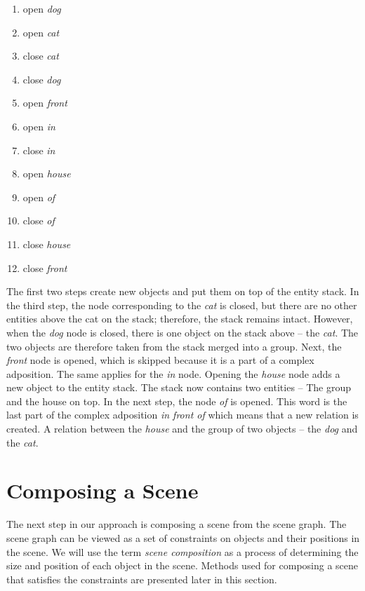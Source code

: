 \begin{enumerate}
    \item open \emph{dog}
    \item open \emph{cat}
    \item close \emph{cat}
    \item close \emph{dog}
    \item open \emph{front}
    \item open \emph{in}
    \item close \emph{in}
    \item open \emph{house}
    \item open \emph{of}
    \item close \emph{of}
    \item close \emph{house}
    \item close \emph{front}
\end{enumerate}

The first two steps create new objects and put them on top of the entity stack. In the third step, the node corresponding to the \emph{cat} is closed, but there are no other entities above the cat on the stack; therefore, the stack remains intact. However, when the \emph{dog} node is closed, there is one object on the stack above -- the \emph{cat}. The two objects are therefore taken from the stack merged into a group. Next, the \emph{front} node is opened, which is skipped because it is a part of a complex adposition. The same applies for the \emph{in} node. Opening the \emph{house} node adds a new object to the entity stack. The stack now contains two entities -- The group and the house on top. In the next step, the node \emph{of} is opened. This word is the last part of the complex adposition \emph{in front of} which means that a new relation is created. A relation between the \emph{house} and the group of two objects -- the \emph{dog} and the \emph{cat}.

\section{Composing a Scene}
\label{sec:composing_scene}

The next step in our approach is composing a scene from the scene graph. The scene graph can be viewed as a set of constraints on objects and their positions in the scene. We will use the term \emph{scene composition} as a process of determining the size and position of each object in the scene. Methods used for composing a scene that satisfies the constraints are presented later in this section.

